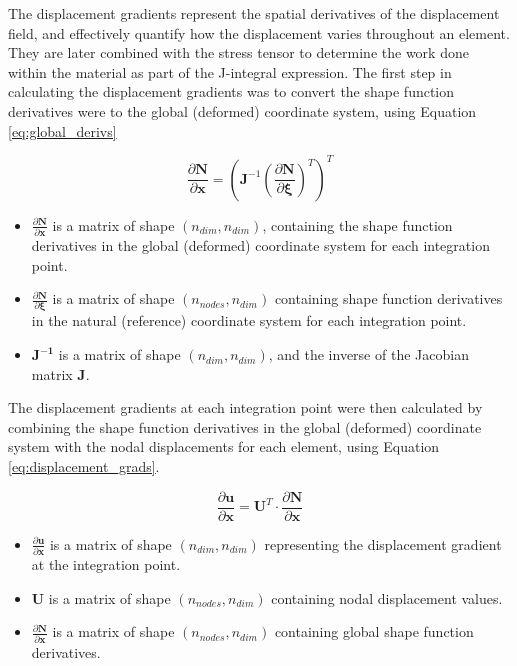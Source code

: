 The displacement gradients represent the spatial derivatives of the displacement field, and effectively quantify how the displacement varies throughout an element. They are later combined with the stress tensor to determine the work done within the material as part of the J-integral expression. The first step in calculating the displacement gradients was to convert the shape function derivatives were to the global (deformed) coordinate system, using Equation \ref{eq:global_derivs}

\begin{equation}\label{eq:global_derivs}
	\frac{\partial \bm{N}}{\partial \bm{x}} = \left(\bm{J}^{-1} \left(\frac{\partial \bm{N}}{\partial \bm{\xi}}\right)^T \right)^T
\end{equation}

\begin{itemize}
	\item $\frac{\partial \bm{N}}{\partial \bm{x}}$ is a matrix of shape $(n_{dim}, n_{dim})$, containing the shape function derivatives in the global (deformed) coordinate system for each integration point.
	\item $\frac{\partial \bm{N}}{\partial \bm{\xi}}$ is a matrix of shape $(n_{nodes}, n_{dim})$ containing shape function derivatives in the natural (reference) coordinate system for each integration point.
	\item $\bm{J^{-1}}$ is a matrix of shape $(n_{dim}, n_{dim})$, and the inverse of the Jacobian matrix $\bm{J}$.
\end{itemize}

The displacement gradients at each integration point were then calculated by combining the shape function derivatives in the global (deformed) coordinate system with the nodal displacements for each element, using Equation \ref{eq:displacement_grads}.

\begin{equation}\label{eq:displacement_grads}
	\frac{\partial \bm{u}}{\partial \bm{x}} = \bm{U}^{T} \cdot \frac{\partial \bm{N}}{\partial \bm{x}}
\end{equation}

\begin{itemize}
	\item $\frac{\partial \bm{u}}{\partial \bm{x}}$ is a matrix of shape $(n_{dim}, n_{dim})$ representing the displacement gradient at the integration point.
	\item $\bm{U}$ is a matrix of shape $(n_{nodes}, n_{dim})$ containing nodal displacement values.
	\item $\frac{\partial \bm{N}}{\partial \bm{x}}$ is a matrix of shape $(n_{nodes}, n_{dim})$ containing global shape function derivatives.
\end{itemize}

